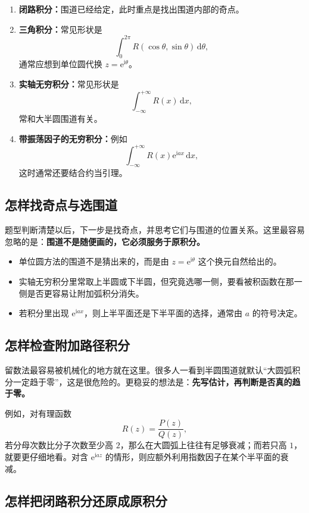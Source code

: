 \begin{enumerate}
    \item \textbf{闭路积分：}围道已经给定，此时重点是找出围道内部的奇点。
    \item \textbf{三角积分：}常见形状是
    \[
        \int_0^{2\pi} R(\cos\theta,\sin\theta)\,\mathrm{d}\theta,
    \]
    通常应想到单位圆代换 $z=\mathrm{e}^{\mathrm{i}\theta}$。
    \item \textbf{实轴无穷积分：}常见形状是
    \[
        \int_{-\infty}^{+\infty} R(x)\,\mathrm{d}x,
    \]
    常和大半圆围道有关。
    \item \textbf{带振荡因子的无穷积分：}例如
    \[
        \int_{-\infty}^{+\infty} R(x)\mathrm{e}^{\mathrm{i}ax}\,\mathrm{d}x,
    \]
    这时通常还要结合约当引理。
\end{enumerate}

\subsection{怎样找奇点与选围道}

题型判断清楚以后，下一步是找奇点，并思考它们与围道的位置关系。这里最容易忽略的是：\textbf{围道不是随便画的，它必须服务于原积分。}

\begin{itemize}
    \item 单位圆方法的围道不是猜出来的，而是由 $z=\mathrm{e}^{\mathrm{i}\theta}$ 这个换元自然给出的。
    \item 实轴无穷积分里常取上半圆或下半圆，但究竟选哪一侧，要看被积函数在那一侧是否更容易让附加弧积分消失。
    \item 若积分里出现 $\mathrm{e}^{\mathrm{i}ax}$，则上半平面还是下半平面的选择，通常由 $a$ 的符号决定。
\end{itemize}

\subsection{怎样检查附加路径积分}

留数法最容易被机械化的地方就在这里。很多人一看到半圆围道就默认``大圆弧积分一定趋于零''，这是很危险的。更稳妥的想法是：\textbf{先写估计，再判断是否真的趋于零。}

例如，对有理函数
\[
    R(z)=\frac{P(z)}{Q(z)},
\]
若分母次数比分子次数至少高 $2$，那么在大圆弧上往往有足够衰减；而若只高 $1$，就要更仔细地看。对含 $\mathrm{e}^{\mathrm{i}az}$ 的情形，则应额外利用指数因子在某个半平面的衰减。

\subsection{怎样把闭路积分还原成原积分}

